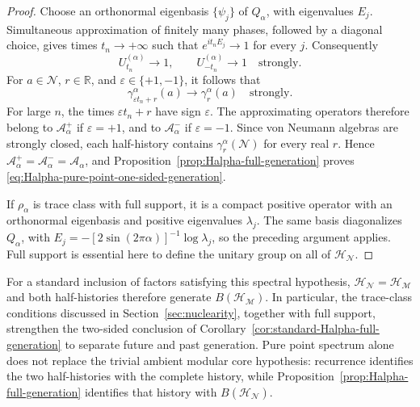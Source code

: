 \documentclass[a4paper,11pt]{article}
\theoremstyle{definition}
\newcommand{\mN}{\mathcal{N}}
\newcommand{\mH}{\mathcal{H}}
\newcommand{\mM}{\mathcal{M}}
\begin{document}
\begin{proof}
Choose an orthonormal eigenbasis $\{\psi_j\}$ of $Q_\alpha$, with
eigenvalues $E_j$. Simultaneous approximation of finitely many phases,
followed by a diagonal choice, gives times $t_n\to+\infty$ such that
$e^{it_nE_j}\to1$ for every $j$. Consequently
\begin{equation}
    U_{t_n}^{(\alpha)}\longrightarrow1,
    \qquad U_{-t_n}^{(\alpha)}\longrightarrow1
    \quad\text{strongly}.
    \label{eq:Halpha-pure-point-recurrence}
\end{equation}
For $a\in\mN$, $r\in\mathbb R$, and
$\varepsilon\in\{+1,-1\}$, it follows that
\begin{equation}
    \gamma_{\varepsilon t_n+r}^\alpha(a)
    \longrightarrow\gamma_r^\alpha(a)
    \quad\text{strongly}.
    \label{eq:Halpha-one-sided-recurrence-approximation}
\end{equation}
For large $n$, the times $\varepsilon t_n+r$ have sign $\varepsilon$.
The approximating operators therefore belong to
$\mathcal A_\alpha^+$ if $\varepsilon=+1$, and to
$\mathcal A_\alpha^-$ if $\varepsilon=-1$. Since von Neumann algebras
are strongly closed, each half-history contains
$\gamma_r^\alpha(\mN)$ for every real $r$. Hence
$\mathcal A_\alpha^+=\mathcal A_\alpha^-=\mathcal A_\alpha$, and
Proposition~\ref{prop:Halpha-full-generation} proves
\eqref{eq:Halpha-pure-point-one-sided-generation}.

If $\rho_\alpha$ is trace class with full support, it is a compact
positive operator with an orthonormal eigenbasis and positive
eigenvalues $\lambda_j$. The same basis diagonalizes $Q_\alpha$, with
$E_j=-[2\sin(2\pi\alpha)]^{-1}\log\lambda_j$, so the preceding argument
applies. Full support is essential here to define the unitary group
on all of $\mH_{\mN}$.
\end{proof}

For a standard inclusion of factors satisfying this spectral hypothesis,
$\mH_{\mN}=\mH_{\mM}$ and both half-histories therefore generate
$B(\mH_{\mM})$. In particular, the trace-class conditions discussed in
Section~\ref{sec:nuclearity}, together with full support, strengthen the
two-sided conclusion of Corollary~\ref{cor:standard-Halpha-full-generation}
to separate future and past generation. Pure point spectrum alone
does not replace the trivial ambient modular core hypothesis: recurrence
identifies the two half-histories with the complete history, while
Proposition~\ref{prop:Halpha-full-generation} identifies that history
with $B(\mH_{\mN})$.
\end{document}
